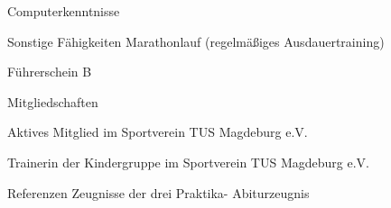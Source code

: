 \documentclass[a4paper, 12pt]{classycv}
\begin{document}
\begin{Resume}
\begin{Entry}{Computerkenntnisse}{}
\begin{List}[skip above=0pt]
    \end{List}
\end{Entry}
%
\begin{Entry}{Sonstige Fähigkeiten}{}%
    Marathonlauf (regelmäßiges Ausdauertraining)%
\end{Entry}
%
\begin{Entry}{Führerschein}{}%
    B%
\end{Entry}
%
%
\begin{Entry}{Mitgliedschaften}{}%
    \begin{List}[skip above=0pt]%
        \item Aktives Mitglied im Sportverein TUS Magdeburg e.V. 
        \item Trainerin der Kindergruppe im Sportverein TUS Magdeburg e.V.
    \end{List}
\end{Entry}
%
\begin{Entry}{Referenzen}{}%
    Zeugnisse der drei Praktika- Abiturzeugnis
\end{Entry}
\end{Resume}
\end{document}
